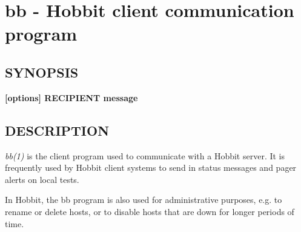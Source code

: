 %
\newpage
\section{bb - Hobbit client communication program}

\subsection{SYNOPSIS}
\textbf{ [options] RECIPIENT message}

\subsection{DESCRIPTION}
\emph{bb(1)} is the client program used to communicate with a Hobbit
server. It is frequently used by Hobbit client systems to send in
status messages and pager alerts on local tests. 


In Hobbit, the bb program is also used for administrative purposes,
e.g. to rename or delete hosts, or to disable hosts that are down for
longer periods of time. 

 
